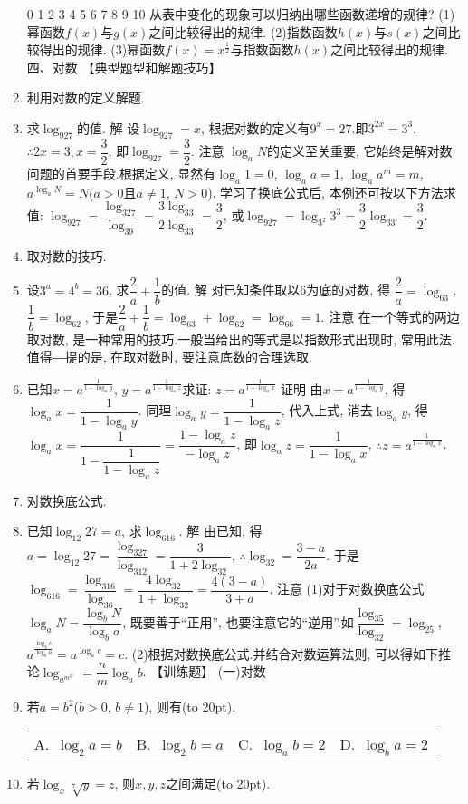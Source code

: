 \documentclass[10pt,a4paper]{article}
\newcommand{\bracket}[1]{(\hbox to #1pt{})}
\newcommand{\fourch}[4]{\par\begin{tabular}{p{.23\textwidth}p{.23\textwidth}p{.23\textwidth}p{.23\textwidth}}
A.~#1 &B.~#2& C.~#3& D.~#4
\end{tabular}}
\begin{document}
\begin{enumerate}[1.]
0				
1				
2				
3				
4				
5				
6				
7				
8				
9				
10				
从表中变化的现象可以归纳出哪些函数递增的规律?
(1)幂函数$f(x)$与$g(x)$之间比较得出的规律.
(2)指数函数$h(x)$与$s(x)$之间比较得出的规律.
(3)幂函数$f(x)=x^{\frac 12}$与指数函数$h(x)$之间比较得出的规律.
四、对数
【典型题型和解题技巧】
\item 利用对数的定义解题.
\item 求$\log _927$的值.
解  设$\log _927=x$, 根据对数的定义有$9^x=27$.即$3^{2x}=3^3$,
$\therefore 2x=3,x=\dfrac 32$, 即$\log _927=\dfrac 32$.
注意  $\log _aN$的定义至关重要, 它始终是解对数问题的首要手段.根据定义, 显然有$\log _a1=0$, $\log _aa=1$, $\log _aa^m=m$, $a^{\log _aN}=N$($a>0$且$a\ne 1$, $N>0$).
学习了换底公式后, 本例还可按以下方法求值:
$\log _927=\dfrac{\log _327}{\log _39}=\dfrac{3\log _33}{2\log _33}=\dfrac 32$, 或$\log _927=\log _{3^2}3^3=\dfrac 32\log _33=\dfrac 32$.
\item 取对数的技巧.
\item 设$3^a=4^b=36$, 求$\dfrac 2a+\dfrac 1b$的值.
解  对已知条件取以6为底的对数, 得
$\dfrac 2a=\log _63$, $\dfrac 1b=\log _62$, 于是$\dfrac 2a+\dfrac 1b=\log _63+\log _62=\log _66=1$.
注意  在一个等式的两边取对数, 是一种常用的技巧.一般当给出的等式是以指数形式出现时, 常用此法.值得―提的是, 在取对数时, 要注意底数的合理选取.
\item 已知$x=a^{\frac 1{1-\log _ay}}$, $y=a^{\frac 1{1-\log _az}}$求证: $z=a^{\frac 1{1-\log _ax}}$
证明  由$x=a^{\frac 1{1-\log _ay}}$, 得$\log _ax=\dfrac 1{1-\log _ay}$.
同理$\log _ay=\dfrac 1{1-\log _az}$, 代入上式, 消去$\log _ay$,
得$\log _ax=\dfrac 1{1-\dfrac 1{1-\log _az}}=\dfrac{1-\log _az}{-\log _az}$, 即$\log _az=\dfrac 1{1-\log _ax}$, $\therefore z=a^{\frac 1{1-\log _ax}}$.
\item 对数换底公式.
\item 已知$\log _{12}27=a$, 求$\log _616$.
解  由已知, 得$a=\log _{12}27=\dfrac{\log _327}{\log _312}=\dfrac 3{1+2\log _32}$, $\therefore \log _32=\dfrac{3-a}{2a}$.
于是$\log _616=\dfrac{\log _316}{\log _36}=\dfrac{4\log _32}{1+\log _32}=\dfrac{4(3-a)}{3+a}$.
注意  (1)对于对数换底公式$\log _aN=\dfrac{\log _bN}{\log _ba}$, 既要善于``正用'', 也要注意它的``逆用''.如$\dfrac{\log _35}{\log _32}=\log _25$, $a^{\frac{\log _bc}{\log _ba}}=a^{\log _ac}=c$.
(2)根据对数换底公式.并结合对数运算法则, 可以得如下推论$\log _{a^{m^{b^n}}}=\dfrac nm\log _ab$.
【训练题】
(一)对数
\item 若$a=b^2$($b>0$, $b\ne 1$), 则有\bracket{20}.
\fourch{$\log _2a=b$}{$\log _2b=a$}{$\log _ab=2$}{$\log _ba=2$}
\item 若$\log _x\sqrt[7]y=z$, 则$x,y,z$之间满足\bracket{20}.

\end{enumerate}
\end{document}
